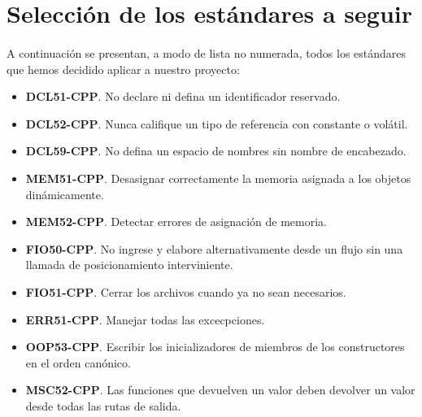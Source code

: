 \section{Selección de los estándares a seguir}

\paragraph{}A continuación se presentan, a modo de lista no numerada, todos los estándares que hemos decidido aplicar a nuestro proyecto:

\begin{itemize}
	\item \textbf{DCL51-CPP}. No declare ni defina un identificador reservado.
	\item \textbf{DCL52-CPP}. Nunca califique un tipo de referencia con constante o volátil.
	\item \textbf{DCL59-CPP}. No defina un espacio de nombres sin nombre de encabezado.
	\item \textbf{MEM51-CPP}. Desasignar correctamente la memoria asignada a los objetos dinámicamente.
	\item \textbf{MEM52-CPP}. Detectar errores de asignación de memoria.
	\item \textbf{FIO50-CPP}. No ingrese y elabore alternativamente desde un flujo sin una llamada de posicionamiento interviniente.
	\item \textbf{FIO51-CPP}. Cerrar los archivos cuando ya no sean necesarios.
	\item \textbf{ERR51-CPP}. Manejar todas las excecpciones.
	\item \textbf{OOP53-CPP}. Escribir los inicializadores de miembros de los constructores en el orden canónico.
	\item \textbf{MSC52-CPP}. Las funciones que devuelven un valor deben devolver un valor desde todas las rutas de salida.
	
\end{itemize}